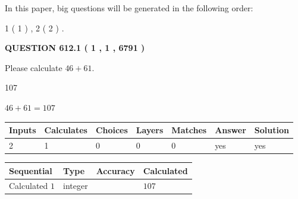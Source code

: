 \documentclass[12pt]{article}
\begin{document}
In this paper, big questions will be generated in the following order: 
   
   
   1 ( 1 )
 ,
   2 ( 2 )
 .
  
\vspace{0.2in}
  
{\textbf{\Large{QUESTION
612.1 
 ( 1 , 1 , 6791 )
}}}
  
  
 
Please calculate $ %
46 +  %
61 $.
 
 
 
\noindent{}
 
 

107
 
 
\noindent{}
 
 

 
 
 
\noindent{}
 
 

$ %
46 +  %
61=   %
107$
 
 
\noindent{}
 
 

 
   
   
   
   
\noindent\begin{tabular}{|l|l|l|l|l|l|l|}
 \hline
Inputs & Calculates & Choices & Layers & Matches & Answer & Solution \\ \hline
 2  & 
 1  & 
 0
  & 
 0  & 
 0  & 
  yes & 
  yes 
  \\ \hline
 \end{tabular}
   
   
   
   
\noindent{}
   
   
  
  
\noindent\begin{tabular}{|l|l|l|l|}
\hline
 Sequential & Type & Accuracy & Calculated \\ 
\hline
 
 
  Calculated $  1 $ & integer &  & 
  $ 107 $ 
 \\  \hline  
 \end{tabular}
   
\end{document}
